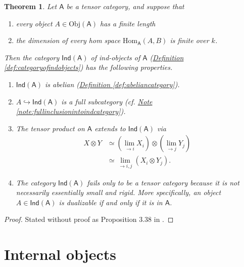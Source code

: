 \documentclass[a4paper]{report}
\newcommand{\Obj}{\mathrm{Obj}}
\newcommand{\Hom}{\mathrm{Hom}}
\theoremstyle{definition}
\theoremstyle{plain}
\newtheorem{theorem}{Theorem}[section]
\theoremstyle{remark}
\begin{document}
\begin{theorem}
  Let $\mathsf{A}$ be a tensor category, and suppose that
  \begin{enumerate}
    \item every object $A \in \Obj(\mathsf{A})$ has a finite length

    \item the dimension of every hom space $\Hom_{\mathsf{A}}(A, B)$ is finite over $k$.
  \end{enumerate}

  Then the category $\mathsf{Ind}(\mathsf{A})$ of ind-objects of $\mathsf{A}$ (\hyperref[def:categoryofindobjects]{Definition \ref*{def:categoryofindobjects}}) has the following properties.
  \begin{enumerate}
    \item $\mathsf{Ind}(\mathsf{A})$ is abelian (\hyperref[def:abeliancategory]{Definition \ref*{def:abeliancategory}}).

    \item $A \hookrightarrow \mathsf{Ind}(\mathsf{A})$ is a full subcategory (cf. \hyperref[note:fullinclusionintoindcategory]{Note \ref*{note:fullinclusionintoindcategory}}).

    \item The tensor product on $\mathsf{A}$ extends to $\mathsf{Ind}(\mathsf{A})$ via
      \begin{align*}
        X \otimes Y &\simeq (\lim_{\rightarrow i}X_{i}) \otimes (\lim_{\rightarrow j}Y_{j}) \\
        &\simeq \lim_{\rightarrow i,j} (X_{i} \otimes Y_{j}).
      \end{align*}

    \item The category $\mathsf{Ind}(\mathsf{A})$ fails only to be a tensor category because it is not necessarily essentially small and rigid. More specifically, an object $A \in \mathsf{Ind}(\mathsf{A})$ is dualizable if and only if it is in $\mathsf{A}$.
  \end{enumerate}
\end{theorem}
\begin{proof}
  Stated without proof as Proposition 3.38 in \cite{nlab-deligne-theorem}.
\end{proof}

\section{Internal objects}
\end{document}
